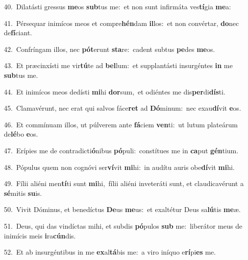 {\numbfont\textcolor{\numbcolor}{40.}}~Dilatásti gressus \textbf{me}\-os \textbf{sub}\-tus me:~\star et non sunt infirmáta ves\-\textbf{tí}\-gia \textbf{me}\-a:\par
{\numbfont\textcolor{\numbcolor}{41.}}~Pérsequar inimícos meos et compre\-\textbf{hén}\-dam \textbf{il}\-los:~\star et non convértar, \textbf{do}\-nec de\-\textbf{fí}\-ciant.\par
{\numbfont\textcolor{\numbcolor}{42.}}~Confríngam illos, nec \textbf{pót}\-erunt \textbf{sta}\-re:~\star cadent subtus \textbf{pe}\-des \textbf{me}\-os.\par
{\numbfont\textcolor{\numbcolor}{43.}}~Et præcinxísti me vir\-\textbf{tú}\-te ad \textbf{bel}\-lum:~\star et supplantásti insurgéntes \textbf{in} me \textbf{sub}\-tus me.\par
{\numbfont\textcolor{\numbcolor}{44.}}~Et inimícos meos dedísti \textbf{mi}\-hi \textbf{dor}\-sum,~\star et odiéntes me dis\-\textbf{per}\-di\-\textbf{dís}\-ti.\par
{\numbfont\textcolor{\numbcolor}{45.}}~Clamavérunt, nec erat qui salvos fáce\textbf{ret} ad \textbf{Dó}\-minum:~\star nec exau\-\textbf{dí}\-vit \textbf{e}\-os.\par
{\numbfont\textcolor{\numbcolor}{46.}}~Et commínuam illos, ut púlverem ante \textbf{fá}\-ciem \textbf{ven}\-ti:~\star ut lutum plateárum de\-\textbf{lé}\-bo \textbf{e}\-os.\par
{\numbfont\textcolor{\numbcolor}{47.}}~Erípies me de contradicti\-\textbf{ó}\-nibus \textbf{pó}\-puli:~\star constítues me in \textbf{ca}\-put \textbf{gén}\-tium.\par
{\numbfont\textcolor{\numbcolor}{48.}}~Pópulus quem non cognóvi ser\-\textbf{ví}\-vit \textbf{mi}\-hi:~\star in audítu auris obe\-\textbf{dí}\-vit \textbf{mi}\-hi.\par
{\numbfont\textcolor{\numbcolor}{49.}}~Fílii aliéni men\-\textbf{tí}\-ti sunt \textbf{mi}\-hi,~\star fílii aliéni inveteráti sunt, et claudicavérunt a \textbf{sé}\-mitis \textbf{su}\-is.\par
{\numbfont\textcolor{\numbcolor}{50.}}~Vivit Dóminus, et benedíctus \textbf{De}\-us \textbf{me}\-us:~\star et exaltétur Deus sa\-\textbf{lú}\-tis \textbf{me}\-æ.\par
{\numbfont\textcolor{\numbcolor}{51.}}~Deus, qui das vindíctas mihi, et subdis \textbf{pó}\-pulos \textbf{sub} me:~\star liberátor meus de inimícis meis \textbf{i}\-ra\-\textbf{cún}\-dis.\par
{\numbfont\textcolor{\numbcolor}{52.}}~Et ab insurgéntibus in me \textbf{ex}\-al\-\textbf{tá}\-bis me:~\star a viro iníquo e\-\textbf{rí}\-pi\textbf{es} me.\par
